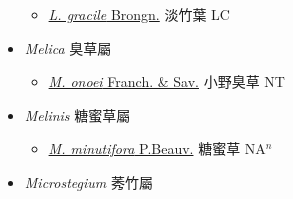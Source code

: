 \begin{itemize}
  \begin{itemize}
        \item[] \href{http://www.theplantlist.org/tpl1.1/search?q=Lophatherum+gracile}{\textit{L. gracile} Brongn.}   淡竹葉 LC
  \end{itemize}
 \item[] \textit{Melica} 臭草屬
                    
  \begin{itemize}
        \item[] \href{http://www.theplantlist.org/tpl1.1/search?q=Melica+onoei}{\textit{M. onoei} Franch. \& Sav.}   小野臭草 NT
  \end{itemize}
 \item[] \textit{Melinis} 糖蜜草屬
                    
  \begin{itemize}
        \item[] \href{http://www.theplantlist.org/tpl1.1/search?q=Melinis+minutifora}{\textit{M. minutifora} P.Beauv.}   糖蜜草 NA$^n$
  \end{itemize}
 \item[] \textit{Microstegium} 莠竹屬
                    

\end{itemize}
